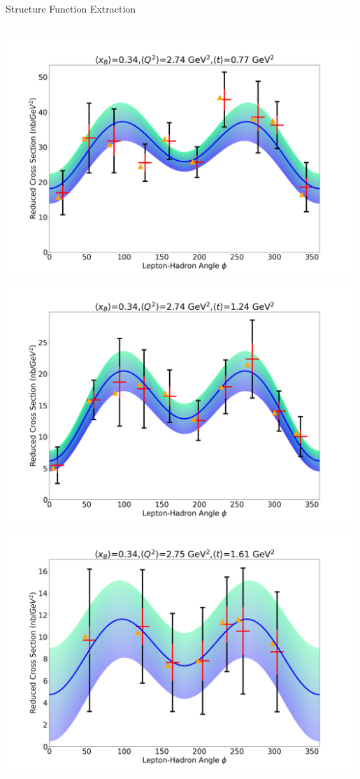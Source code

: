 \documentclass[aspectratio=169]{beamer}
\begin{document}
\begin{frame}{Structure Function Extraction}
\begin{columns}
            \includegraphics[width=0.99\textwidth]{defense/phi_fitting/xqt_302560.png}
            \includegraphics[width=0.99\textwidth]{defense/phi_fitting/xqt_3025100.png}
            \includegraphics[width=0.99\textwidth]{defense/phi_fitting/xqt_3025150.png}
            

\end{columns}
\end{frame}
\end{document}
